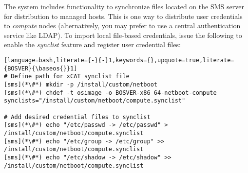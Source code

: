 The \xCAT{} system includes functionality to synchronize files located on the
SMS server for distribution to managed hosts. This is one way to
distribute user credentials to {\em compute} nodes (alternatively, you may
prefer to use a central authentication service like LDAP). To import local file-based
credentials, issue the following to enable the {\em synclist} feature and
register user credential files:

\begin{lstlisting}[language=bash,literate={-}{-}1,keywords={},upquote=true,literate={BOSVER}{\baseos{}}1]
# Define path for xCAT synclist file
[sms](*\#*) mkdir -p /install/custom/netboot
[sms](*\#*) chdef -t osimage -o BOSVER-x86_64-netboot-compute synclists="/install/custom/netboot/compute.synclist"

# Add desired credential files to synclist
[sms](*\#*) echo "/etc/passwd -> /etc/passwd" > /install/custom/netboot/compute.synclist
[sms](*\#*) echo "/etc/group -> /etc/group" >> /install/custom/netboot/compute.synclist
[sms](*\#*) echo "/etc/shadow -> /etc/shadow" >> /install/custom/netboot/compute.synclist
\end{lstlisting}
